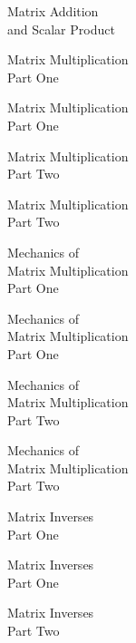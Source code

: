 \documentclass{titlescreen}
\begin{document}
\begin{videotitle}
  Matrix Addition  \\[0.5ex]
  and Scalar Product 
\end{videotitle}
\begin{videoend}
  Matrix Multiplication  \\[1ex]
  Part One
\end{videoend}

\begin{videotitle}
  Matrix Multiplication  \\[1ex]
  Part One
\end{videotitle}
\begin{videoend}
  Matrix Multiplication  \\[1ex]
  Part Two
\end{videoend}

\begin{videotitle}
  Matrix Multiplication  \\[1ex]
  Part Two
\end{videotitle}
\begin{videoend}
  Mechanics of \\[0.5ex]
  Matrix Multiplication  \\[1ex]
  Part One
\end{videoend}

\begin{videotitle}
  Mechanics of \\[0.5ex]
  Matrix Multiplication  \\[1ex]
  Part One
\end{videotitle}
\begin{videoend}
  Mechanics of \\[0.5ex]
  Matrix Multiplication  \\[1ex]
  Part Two
\end{videoend}

\begin{videotitle}
  Mechanics of \\[0.5ex]
  Matrix Multiplication  \\[1ex]
  Part Two
\end{videotitle}
\begin{videoend}
  Matrix Inverses  \\[1ex]
  Part One
\end{videoend}

\begin{videotitle}
  Matrix Inverses  \\[1ex]
  Part One
\end{videotitle}
\begin{videoend}
  Matrix Inverses  \\[1ex]
  Part Two
\end{videoend}
\end{document}
